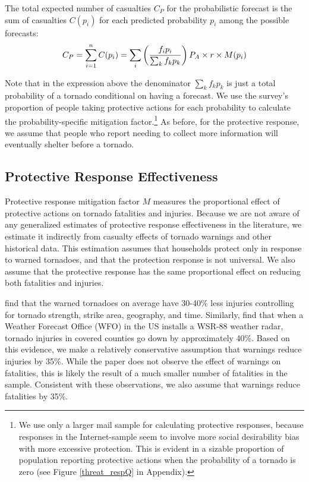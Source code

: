 \documentclass{ametsocV6.1}
\newcommand{\add}[1]{{\color{red}#1}}
\begin{document}
The total expected number of casualties $C_P$ for the probabilistic forecast is the sum of casualties $C(p_i)$ for each predicted probability $p_i$ among the possible forecasts:
\begin{equation}
C_P=\sum_{i=1}^n C(p_i)=\sum_i \left({f_i p_i\over \sum_k f_k p_k}\right) P_A \times r  \times M(p_i)
\end{equation}

\add{Note that in the expression above the denominator $\sum_k f_k p_k$ is just a total probability of a tornado conditional on having a forecast.} \add{We use the survey's proportion of people taking protective actions for each probability to calculate the probability-specific mitigation factor.\footnote{We use only a larger mail sample for calculating protective responses, because responses in the Internet-sample seem to involve more social desirability bias with more excessive protection. This is evident in a sizable proportion of population reporting protective actions when the probability of a tornado is zero (see Figure \ref{threat_respQ} in Appendix). }} \add{As before,} for the protective response, we assume that people who report needing to collect more information will eventually shelter before a tornado. 

\vspace{10pt}
\subsection{Protective Response Effectiveness} 
Protective response mitigation factor $M$ measures the proportional effect of protective actions on tornado fatalities and injuries. Because we are not aware of any generalized estimates of protective response effectiveness in the literature, we estimate it indirectly from casualty effects of tornado warnings and other historical data. This estimation assumes that households protect only in response to warned tornadoes, and that the protection response is not universal. We also assume that the protective response has the same proportional effect on reducing both fatalities and injuries.

\citet{simmons_false_2009} find that the warned tornadoes on average have 30-40\% less injuries controlling for tornado strength, strike area, geography, and time. Similarly, \citet{simmons_wsr-88d_2005} find that when a Weather Forecast Office (WFO) in the US installs a WSR-88 weather radar, tornado injuries in covered counties go down by approximately 40\%. Based on this evidence, we make a relatively conservative assumption that warnings reduce injuries by 35\%. While the paper does not observe the effect of warnings on fatalities, this is likely the result of a much smaller number of fatalities in the sample. Consistent with these observations, we also assume that warnings reduce fatalities by 35\%.
\end{document}
